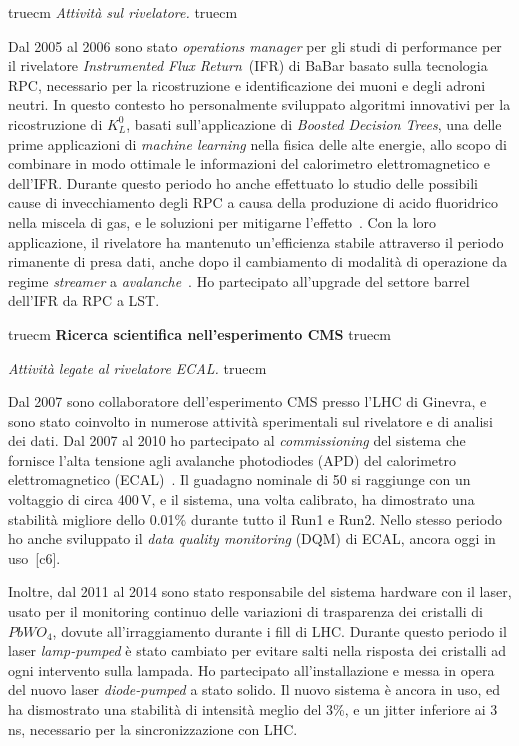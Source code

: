 \documentclass[11pt,twoside,a4paper]{article}
\begin{document}
 truecm
\textit{Attivit\`a sul rivelatore.}
 truecm

Dal 2005 al 2006 sono stato \textit{operations manager} per gli studi
di performance per il rivelatore \textit{Instrumented Flux
  Return}~(IFR) di BaBar basato sulla tecnologia RPC, necessario per
la ricostruzione e identificazione dei muoni e degli adroni neutri. In
questo contesto ho personalmente sviluppato algoritmi innovativi per
la ricostruzione di $K^0_L$, basati sull'applicazione di
\textit{Boosted Decision Trees}, una delle prime applicazioni di
\textit{machine learning} nella fisica delle alte energie, allo scopo
di combinare in modo ottimale le informazioni del calorimetro
elettromagnetico e dell'IFR. Durante questo periodo ho anche
effettuato lo studio delle possibili cause di invecchiamento degli RPC
a causa della produzione di acido fluoridrico nella miscela di gas, e
le soluzioni per mitigarne l'effetto~\cite{Band:2008zza}. Con la loro
applicazione, il rivelatore ha mantenuto un'efficienza stabile
attraverso il periodo rimanente di presa dati, anche dopo il
cambiamento di modalit\`a di operazione da regime \textit{streamer} a
\textit{avalanche}~\cite{Band:2006ig,Anulli:2005wi}. Ho partecipato
all'upgrade del settore barrel dell'IFR da RPC a LST.

\clearpage

 truecm
{\bf{Ricerca scientifica nell'esperimento CMS}}
 truecm

\textit{Attivit\`a legate al rivelatore ECAL.}
 truecm

Dal 2007 sono collaboratore dell'esperimento CMS presso l'LHC di
Ginevra, e sono stato coinvolto in numerose attivit\`a sperimentali
sul rivelatore e di analisi dei dati. Dal 2007 al 2010 ho partecipato
al \textit{commissioning} del sistema che fornisce l'alta tensione
agli avalanche photodiodes (APD) del calorimetro elettromagnetico
(ECAL)~\cite{Bartoloni_2013}. Il guadagno nominale di 50 si raggiunge
con un voltaggio di circa 400\,V, e il sistema, una volta calibrato,
ha dimostrato una stabilit\`a migliore dello 0.01\% durante tutto il
Run1 e Run2.  Nello stesso periodo ho anche sviluppato il \textit{data
  quality monitoring} (DQM) di ECAL, ancora oggi in
uso~\cite{DiMarco:2009zz}[c6].

Inoltre, dal 2011 al 2014 sono stato responsabile del sistema hardware
con il laser, usato per il monitoring continuo delle variazioni di
trasparenza dei cristalli di $PbWO_4$, dovute all'irraggiamento
durante i fill di LHC. Durante questo periodo il laser
\textit{lamp-pumped} \`e stato cambiato per evitare salti nella
risposta dei cristalli ad ogni intervento sulla lampada. Ho
partecipato all'installazione e messa in opera del nuovo laser
\textit{diode-pumped} a stato solido. Il nuovo sistema \`e ancora in
uso, ed ha dismostrato una stabilit\`a di intensit\`a meglio del 3\%,
e un jitter inferiore ai 3\,ns, necessario per la sincronizzazione con
LHC.
\end{document}
